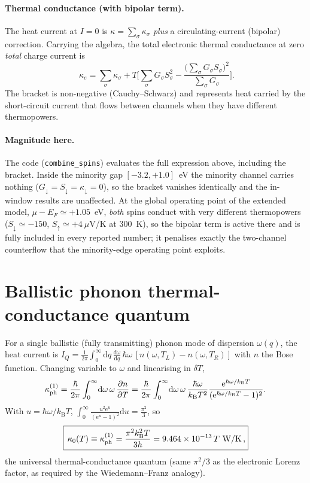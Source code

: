 \documentclass[11pt]{article}
\newcommand{\dd}{\mathrm{d}}
\newcommand{\ee}{\mathrm{e}}
\newcommand{\kB}{k_{\mathrm B}}
\begin{document}
\paragraph{Thermal conductance (with bipolar term).} The heat current at $I=0$ is
$\kappa=\sum_\sigma\kappa_\sigma$ \emph{plus} a circulating-current (bipolar) correction. Carrying
the algebra, the total electronic thermal conductance at zero \emph{total} charge current is
\begin{equation}
\boxed{\;\kappa_e=\sum_\sigma\kappa_\sigma
+T\Big[\sum_\sigma G_\sigma S_\sigma^2-\frac{\big(\sum_\sigma G_\sigma S_\sigma\big)^2}{\sum_\sigma G_\sigma}\Big].}
\end{equation}
The bracket is non-negative (Cauchy--Schwarz) and represents heat carried by the short-circuit
current that flows between channels when they have different thermopowers.

\paragraph{Magnitude here.} The code (\texttt{combine\_spins}) evaluates the full expression above,
including the bracket. Inside the minority gap $[-3.2,+1.0]$~eV the minority channel carries
nothing ($G_\downarrow=S_\downarrow=\kappa_\downarrow=0$), so the bracket vanishes identically
and the in-window results are unaffected. At the global operating point of the extended model,
$\mu-E_F\simeq+1.05$~eV, \emph{both} spins conduct with very different thermopowers
($S_\downarrow\simeq-150$, $S_\uparrow\simeq+4~\mu$V/K at 300~K), so the bipolar term is active
there and is fully included in every reported number; it penalises exactly the two-channel
counterflow that the minority-edge operating point exploits.

\section{Ballistic phonon thermal-conductance quantum}

For a single ballistic (fully transmitting) phonon mode of dispersion $\omega(q)$, the heat
current is $I_Q=\frac1{2\pi}\int_0^\infty\dd q\,\frac{\dd\omega}{\dd q}\,\hbar\omega\,[n(\omega,T_L)-n(\omega,T_R)]$
with $n$ the Bose function. Changing variable to $\omega$ and linearising in $\delta T$,
\begin{equation}
\kappa_{\rm ph}^{(1)}=\frac{\hbar}{2\pi}\int_0^\infty\!\dd\omega\,\omega\,\frac{\partial n}{\partial T}
=\frac{\hbar}{2\pi}\int_0^\infty\!\dd\omega\,\omega\,\frac{\hbar\omega}{\kB T^2}\frac{\ee^{\hbar\omega/\kB T}}{(\ee^{\hbar\omega/\kB T}-1)^2}.
\end{equation}
With $u=\hbar\omega/\kB T$, $\displaystyle\int_0^\infty\frac{u^2\ee^u}{(\ee^u-1)^2}\dd u=\frac{\pi^2}{3}$, so
\begin{equation}
\boxed{\,\kappa_0(T)\equiv\kappa_{\rm ph}^{(1)}=\frac{\pi^2\kB^2 T}{3h}=9.464\times10^{-13}\,T~\text{W/K}\,,}
\end{equation}
the universal thermal-conductance quantum (same $\pi^2/3$ as the electronic Lorenz factor, as
required by the Wiedemann--Franz analogy).
\end{document}
